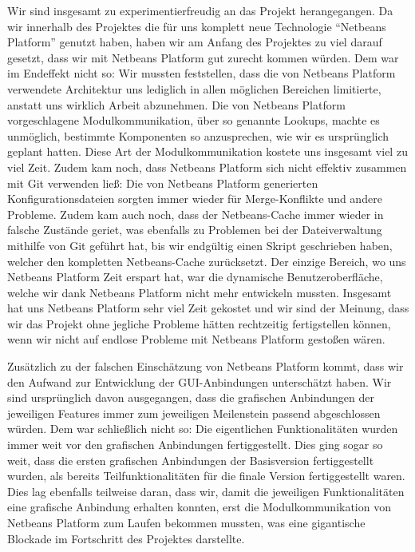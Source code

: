 Wir sind insgesamt zu experimentierfreudig an das Projekt herangegangen. Da wir innerhalb des Projektes die für uns komplett neue Technologie ``Netbeans Platform'' genutzt haben, haben wir am Anfang des Projektes zu viel darauf gesetzt, dass wir mit Netbeans Platform gut zurecht kommen würden. Dem war im Endeffekt nicht so: Wir mussten feststellen, dass die von Netbeans Platform verwendete Architektur uns lediglich in allen möglichen Bereichen limitierte, anstatt uns wirklich Arbeit abzunehmen. Die von Netbeans Platform vorgeschlagene Modulkommunikation, über so genannte Lookups, machte es unmöglich, bestimmte Komponenten so anzusprechen, wie wir es ursprünglich geplant hatten. Diese Art der Modulkommunikation kostete uns insgesamt viel zu viel Zeit. Zudem kam noch, dass Netbeans Platform sich nicht effektiv zusammen mit Git verwenden ließ: Die von Netbeans Platform generierten Konfigurationsdateien sorgten immer wieder für Merge-Konflikte und andere Probleme. Zudem kam auch noch, dass der Netbeans-Cache immer wieder in falsche Zustände geriet, was ebenfalls zu Problemen bei der Dateiverwaltung mithilfe von Git geführt hat, bis wir endgültig einen Skript geschrieben haben, welcher den kompletten Netbeans-Cache zurücksetzt. Der einzige Bereich, wo uns Netbeans Platform Zeit erspart hat, war die dynamische Benutzeroberfläche, welche wir dank Netbeans Platform nicht mehr entwickeln mussten. Insgesamt hat uns Netbeans Platform sehr viel Zeit gekostet und wir sind der Meinung, dass wir das Projekt ohne jegliche Probleme hätten rechtzeitig fertigstellen können, wenn wir nicht auf endlose Probleme mit Netbeans Platform gestoßen wären.

Zusätzlich zu der falschen Einschätzung von Netbeans Platform kommt, dass wir den Aufwand zur Entwicklung der GUI-Anbindungen unterschätzt haben. Wir sind ursprünglich davon ausgegangen, dass die grafischen Anbindungen der jeweiligen Features immer zum jeweiligen Meilenstein passend abgeschlossen würden. Dem war schließlich nicht so: Die eigentlichen Funktionalitäten wurden immer weit vor den grafischen Anbindungen fertiggestellt. Dies ging sogar so weit, dass die ersten grafischen Anbindungen der Basisversion fertiggestellt wurden, als bereits Teilfunktionalitäten für die finale Version fertiggestellt waren. Dies lag ebenfalls teilweise daran, dass wir, damit die jeweiligen Funktionalitäten eine grafische Anbindung erhalten konnten, erst die Modulkommunikation von Netbeans Platform zum Laufen bekommen mussten, was eine gigantische Blockade im Fortschritt des Projektes darstellte.

